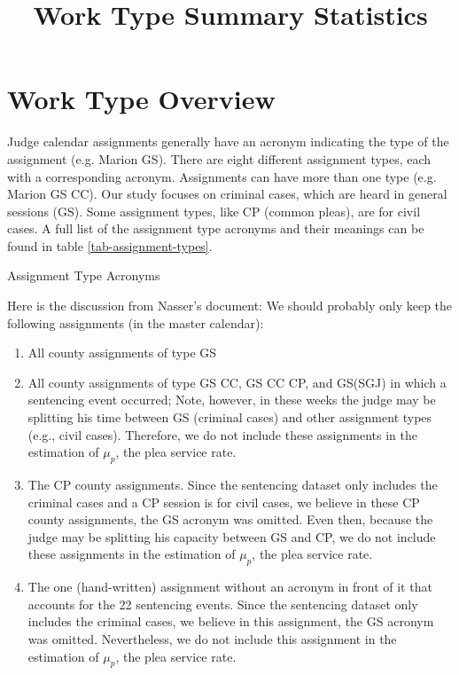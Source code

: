 \documentclass[11pt]{article}
\title{Work Type Summary Statistics}
\begin{document}
\maketitle

\section{Work Type Overview}
Judge calendar assignments generally have an acronym indicating the type of the assignment (e.g. Marion GS). There are eight different assignment types, each with a corresponding acronym. Assignments can have more than one type (e.g. Marion GS CC). Our study focuses on criminal cases, which are heard in general sessions (GS). Some assignment types, like CP (common pleas), are for civil cases. A full list of the assignment type acronyms and their meanings can be found in table \ref{tab-assignment-types}.

  \begin{table}[H]
    \centering
    \caption{Assignment Type Acronyms}
    \label{tab-assignment-types}
    
  \end{table}

  Here is the discussion from Nasser's document: We should probably only keep the following assignments (in the master calendar):
  \begin{enumerate}
    \vspace{-2mm}
    \item All county assignments of type GS
    \item All county assignments of type GS CC, GS CC CP, and GS(SGJ) in which a sentencing event occurred;  Note, however, in these weeks the judge may be splitting his time between GS (criminal cases) and other assignment types (e.g., civil cases). Therefore, we do not include these assignments in the estimation of $\mu_p$, the plea service rate.
    \item The CP county assignments. Since the sentencing dataset only includes the criminal cases and a CP session is for civil cases, we believe in these CP county assignments, the GS acronym was omitted. Even then, because the judge may be splitting his capacity between GS and CP, we do not include these assignments in the estimation of $\mu_p$, the plea service rate.
    \item The one (hand-written) assignment without an acronym in front of it that accounts for the 22 sentencing events. Since the sentencing dataset only includes the criminal cases, we believe in this assignment, the GS acronym was omitted. Nevertheless, we do not include this assignment in the estimation of $\mu_p$, the plea service rate.
  \end{enumerate}
\end{document}
